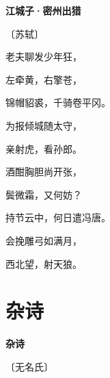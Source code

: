\documentclass[12pt,UTF-8,openany,fontset=none]{ctexbook}
\begin{document}

\begin{center}
    {\bfseries 江城子·密州出猎}

    \vspace{18pt}

    \begin{large}\xuwen
        〔苏轼〕
    \end{large}

\end{center}

    \vspace{18pt}  %

\begin{center}
    \begin{Large}

        老夫聊发少年狂，

        左牵黄，右擎苍，

        锦帽貂裘，千骑卷平冈。

        为报倾城随太守，

        亲射虎，看孙郎。

        \vspace{18pt}  %

        酒酣胸胆尚开张，

        鬓微霜，又何妨？

        持节云中，何日遣冯唐。

        会挽雕弓如满月，

        西北望，射天狼。

    \end{Large}

\end{center}

\vspace{8pt}
\clearpage

\section{杂诗}


\begin{center}
    {\bfseries 杂诗}

    \vspace{18pt}

    \begin{large}\xuwen
        〔无名氏〕
    \end{large}

\end{center}
\end{document}
